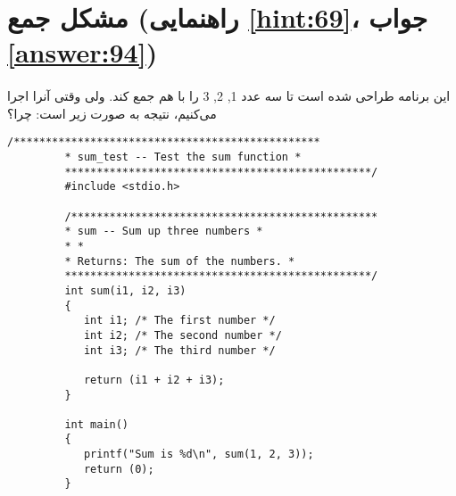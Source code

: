 \section[مشکل جمع]{مشکل جمع \protect{} (راهنمایی \ref{hint:69}، جواب \ref{answer:94})}
\paragraph{}\label{prog:69}
این برنامه طراحی شده است تا سه عدد 1, 2, 3 را با هم جمع کند. ولی وقتی آنرا اجرا می‌کنیم، نتیجه به صورت زیر است:
\LTR\noindent
{}
\RTL
چرا؟

\begin{LTR}
    \begin{lstlisting}[style=C++Style]
         /************************************************
         * sum_test -- Test the sum function *
         ************************************************/
         #include <stdio.h>

         /************************************************
         * sum -- Sum up three numbers *
         * *
         * Returns: The sum of the numbers. *
         ************************************************/
         int sum(i1, i2, i3)
         {
            int i1; /* The first number */
            int i2; /* The second number */
            int i3; /* The third number */

         	return (i1 + i2 + i3);
         }

         int main()
         {
         	printf("Sum is %d\n", sum(1, 2, 3));
         	return (0);
         }
    \end{lstlisting}
\end{LTR}